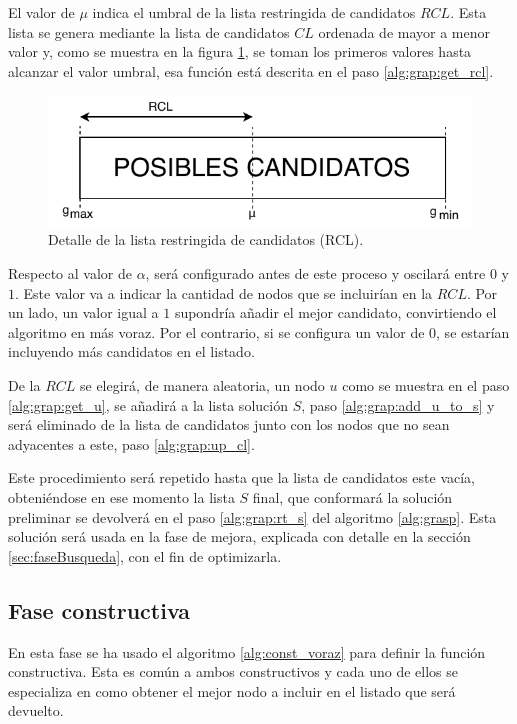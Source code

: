 El valor de $\mu$ indica el umbral de la lista restringida de candidatos $RCL$. Esta lista se genera mediante la lista de candidatos $CL$ ordenada de mayor a menor valor y, como se muestra en la figura \ref{fig:rcl}, se toman los primeros valores hasta alcanzar el valor umbral, esa función está descrita  en el paso \ref{alg:grap:get_rcl}.

 \begin{figure}[H]
	\centering
	\includegraphics{Figures/rcl.pdf}
	\caption{Detalle de la lista restringida de candidatos (RCL).}
	\label{fig:rcl}
\end{figure}

Respecto al valor de $\alpha$, será configurado antes de este proceso y oscilará entre $0$ y $1$. Este valor va a indicar la cantidad de nodos que se incluirían en la $RCL$. Por un lado, un valor igual a $1$ supondría añadir el mejor candidato, convirtiendo el algoritmo en más voraz. Por el contrario, si se configura un valor de $0$, se estarían incluyendo más candidatos en el listado.

De la $RCL$ se elegirá, de manera aleatoria, un nodo $u$ como se muestra en el paso \ref{alg:grap:get_u}, se añadirá a la lista solución $S$, paso \ref{alg:grap:add_u_to_s} y será eliminado de la lista de candidatos junto con los nodos que no sean adyacentes a este, paso \ref{alg:grap:up_cl}.

Este procedimiento será repetido hasta que la lista de candidatos este vacía, obteniéndose en ese momento la lista $S$ final, que conformará la solución preliminar se devolverá en el paso \ref{alg:grap:rt_s} del algoritmo \ref{alg:grasp}. Esta solución será usada en la fase de mejora, explicada con detalle en la sección \ref{sec:faseBusqueda}, con el fin de optimizarla.

\subsection{Fase constructiva}
\label{sec:faseConstructiva}
En esta fase se ha usado el algoritmo \ref{alg:const_voraz} para definir la función constructiva. Esta es común a ambos constructivos y cada uno de ellos se especializa en como obtener el mejor nodo a incluir en el listado que será devuelto.\\

